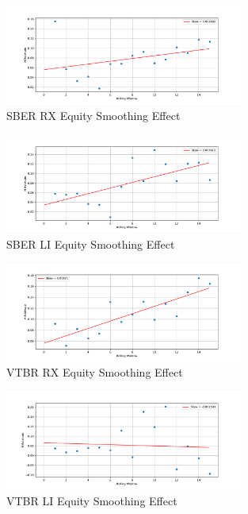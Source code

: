 \begin{figure}[h]
    \centering
    \includegraphics[width=0.7\textwidth]{fig/SBER RX Equity Smoothing Effect.pdf}
    \caption{SBER RX Equity Smoothing Effect}
\end{figure}

\begin{figure}[h]
    \centering
    \includegraphics[width=0.7\textwidth]{fig/SBER LI Equity Smoothing Effect.pdf}
    \caption{SBER LI Equity Smoothing Effect}
\end{figure} 

\begin{figure}[h]
    \centering
    \includegraphics[width=0.7\textwidth]{fig/VTBR RX Equity Smoothing Effect.pdf}
    \caption{VTBR RX Equity Smoothing Effect}
\end{figure} 

\begin{figure}[h]
    \centering
    \includegraphics[width=0.7\textwidth]{fig/VTBR LI Equity Smoothing Effect.pdf}
    \caption{VTBR LI Equity Smoothing Effect}
\end{figure} 

